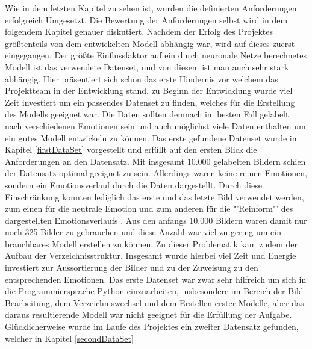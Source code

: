 \documentclass[12pt, a4paper]{report}
\begin{document}
Wie in dem letzten Kapitel zu sehen ist, wurden die definierten Anforderungen erfolgreich Umgesetzt. Die Bewertung der Anforderungen selbst wird in dem folgendem Kapitel genauer diskutiert. Nachdem der Erfolg des Projektes größtenteils von dem entwickelten Modell abhängig war, wird auf dieses zuerst eingegangen. 
\newline
Der größte Einflussfaktor auf ein durch neuronale Netze berechnetes Modell ist das verwendete Datenset, und von diesem ist man auch sehr stark abhängig. Hier präsentiert sich schon das erste Hindernis vor welchem das Projektteam in der Entwicklung stand. zu Beginn der Entwicklung wurde viel Zeit investiert um ein passendes Datenset zu finden, welches für die Erstellung des Modells geeignet war. Die Daten sollten demnach im besten Fall gelabelt nach verschiedenen Emotionen sein und auch möglichst viele Daten enthalten um ein gutes Modell entwickeln zu können. Das erste gefundene Datenset wurde in Kapitel \ref{firstDataSet}
vorgestellt und erfüllt auf den ersten Blick die Anforderungen an den Datensatz. Mit insgesamt 10.000 gelabelten Bildern schien der Datensatz optimal geeignet zu sein. Allerdings waren keine reinen Emotionen, sondern ein Emotionsverlauf durch die Daten dargestellt. Durch diese Einschränkung konnten lediglich das erste und das letzte Bild verwendet werden, zum einen für die neutrale Emotion und zum anderen für die 
"'Reinform"' des dargestellten Emotionsverlaufs . Aus den anfangs 10.000 Bildern waren damit nur noch 325 Bilder zu gebrauchen und diese Anzahl war viel zu gering um ein brauchbares Modell erstellen zu können. Zu dieser Problematik kam zudem der Aufbau der Verzeichnisstruktur. Insgesamt wurde hierbei viel Zeit und Energie investiert zur Aussortierung der Bilder und zu der Zuweisung zu den entsprechenden Emotionen. Das erste Datenset war zwar sehr hilfreich um sich in die Programmiersprache Python einzuarbeiten, insbesondere im Bereich der Bild Bearbeitung, dem Verzeichniswechsel und dem Erstellen erster Modelle, aber das daraus resultierende Modell war nicht geeignet für die Erfüllung der Aufgabe.
\newline
Glücklicherweise wurde im Laufe des Projektes ein zweiter Datensatz gefunden, welcher in Kapitel \ref{secondDataSet}
\end{document}

